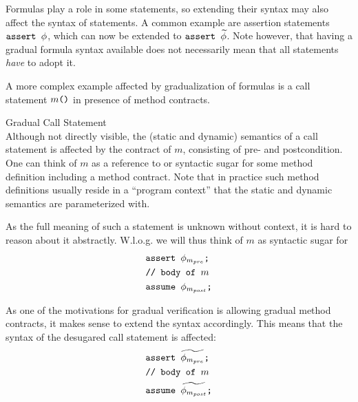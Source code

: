 Formulas play a role in some statements, so extending their syntax may also affect the syntax of statements.
A common example are assertion statements $\textup{\texttt{assert $\phi$}}$, which can now be extended to $\textup{\texttt{assert $\widetilde{\phi}$}}$.
Note however, that having a gradual formula syntax available does not necessarily mean that all statements \emph{have} to adopt it.

A more complex example affected by gradualization of formulas is a call statement $\textup{\texttt{$m$()}}$ in presence of method contracts.
\begin{example}{Gradual Call Statement}~\\
    Although not directly visible, the (static and dynamic) semantics of a call statement is affected by the contract of $m$, consisting of pre- and postcondition.
    One can think of $m$ as a reference to or syntactic sugar for some method definition including a method contract.
    Note that in practice such method definitions usually reside in a “program context” that the static and dynamic semantics are parameterized with.
    
    As the full meaning of such a statement is unknown without context, it is hard to reason about it abstractly.
    W.l.o.g. we will thus think of $m$ as syntactic sugar for 
    \begin{align*}
    &\textup{\texttt{assert $\phi_{m_{pre}}$;}}\\
    &\textup{\texttt{// body of $m$}}\\
    &\textup{\texttt{assume $\phi_{m_{post}}$;}}
    \end{align*}
    
    As one of the motivations for gradual verification is allowing gradual method contracts, it makes sense to extend the syntax accordingly.
    This means that the syntax of the desugared call statement is affected:
    \begin{align*}
    &\textup{\texttt{assert $\widetilde{\phi_{m_{pre}}}$;}}\\
    &\textup{\texttt{// body of $m$}}\\
    &\textup{\texttt{assume $\widetilde{\phi_{m_{post}}}$;}}
    \end{align*}
\end{example}

